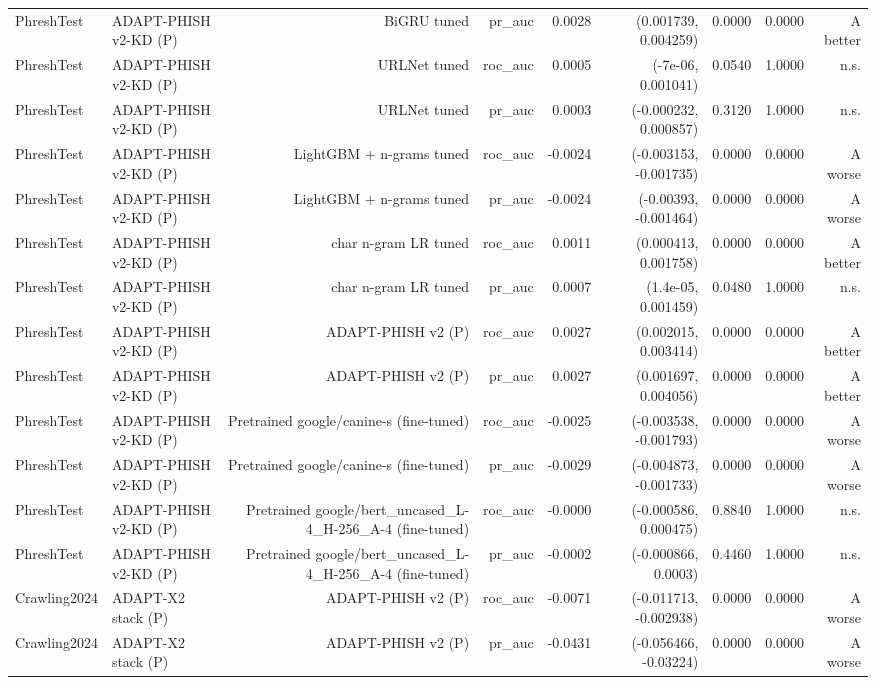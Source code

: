 \begin{table}[t]
\begin{tabular}{llrrrrrrr}
PhreshTest & ADAPT-PHISH v2-KD (P) & BiGRU tuned & pr\_auc & 0.0028 & (0.001739, 0.004259) & 0.0000 & 0.0000 & A better \\
PhreshTest & ADAPT-PHISH v2-KD (P) & URLNet tuned & roc\_auc & 0.0005 & (-7e-06, 0.001041) & 0.0540 & 1.0000 & n.s. \\
PhreshTest & ADAPT-PHISH v2-KD (P) & URLNet tuned & pr\_auc & 0.0003 & (-0.000232, 0.000857) & 0.3120 & 1.0000 & n.s. \\
PhreshTest & ADAPT-PHISH v2-KD (P) & LightGBM + n-grams tuned & roc\_auc & -0.0024 & (-0.003153, -0.001735) & 0.0000 & 0.0000 & A worse \\
PhreshTest & ADAPT-PHISH v2-KD (P) & LightGBM + n-grams tuned & pr\_auc & -0.0024 & (-0.00393, -0.001464) & 0.0000 & 0.0000 & A worse \\
PhreshTest & ADAPT-PHISH v2-KD (P) & char n-gram LR tuned & roc\_auc & 0.0011 & (0.000413, 0.001758) & 0.0000 & 0.0000 & A better \\
PhreshTest & ADAPT-PHISH v2-KD (P) & char n-gram LR tuned & pr\_auc & 0.0007 & (1.4e-05, 0.001459) & 0.0480 & 1.0000 & n.s. \\
PhreshTest & ADAPT-PHISH v2-KD (P) & ADAPT-PHISH v2 (P) & roc\_auc & 0.0027 & (0.002015, 0.003414) & 0.0000 & 0.0000 & A better \\
PhreshTest & ADAPT-PHISH v2-KD (P) & ADAPT-PHISH v2 (P) & pr\_auc & 0.0027 & (0.001697, 0.004056) & 0.0000 & 0.0000 & A better \\
PhreshTest & ADAPT-PHISH v2-KD (P) & Pretrained google/canine-s (fine-tuned) & roc\_auc & -0.0025 & (-0.003538, -0.001793) & 0.0000 & 0.0000 & A worse \\
PhreshTest & ADAPT-PHISH v2-KD (P) & Pretrained google/canine-s (fine-tuned) & pr\_auc & -0.0029 & (-0.004873, -0.001733) & 0.0000 & 0.0000 & A worse \\
PhreshTest & ADAPT-PHISH v2-KD (P) & Pretrained google/bert\_uncased\_L-4\_H-256\_A-4 (fine-tuned) & roc\_auc & -0.0000 & (-0.000586, 0.000475) & 0.8840 & 1.0000 & n.s. \\
PhreshTest & ADAPT-PHISH v2-KD (P) & Pretrained google/bert\_uncased\_L-4\_H-256\_A-4 (fine-tuned) & pr\_auc & -0.0002 & (-0.000866, 0.0003) & 0.4460 & 1.0000 & n.s. \\
Crawling2024 & ADAPT-X2 stack (P) & ADAPT-PHISH v2 (P) & roc\_auc & -0.0071 & (-0.011713, -0.002938) & 0.0000 & 0.0000 & A worse \\
Crawling2024 & ADAPT-X2 stack (P) & ADAPT-PHISH v2 (P) & pr\_auc & -0.0431 & (-0.056466, -0.03224) & 0.0000 & 0.0000 & A worse \\

\end{tabular}
\end{table}
